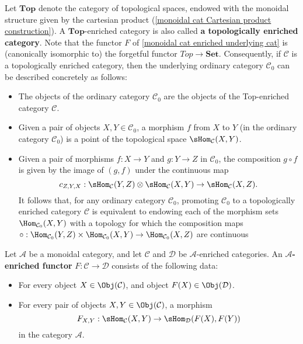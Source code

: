 \begin{example}\label{monoidal cat enriched over Top}
Let $\mathbf{Top}$ denote the category of topological spaces, endowed with the monoidal structure given by the cartesian product (\cref{monoidal cat Cartesian product construction}). A $\mathbf{Top}$-enriched category is also called \textbf{a topologically enriched category}. Note that the functor $F$ of \cref{monoidal cat enriched underlying cat} is (canonically isomorphic to) the forgetful functor $Top\to\mathbf{Set}$. Consequently, if $\mathcal{C}$ is a topologically enriched category, then the underlying ordinary category $\mathcal{C}_0$ can be described concretely as follows:
\begin{itemize}
\item The objects of the ordinary category $\mathcal{C}_0$ are the objects of the Top-enriched category $\mathcal{C}$.
\item Given a pair of objects $X,Y\in\mathcal{C}_0$, a morphism $f$ from $X$ to $Y$ (in the ordinary category $\mathcal{C}_0$) is a point of the topological space $\sHom_{\mathcal{C}}(X,Y)$.
\item Given a pair of morphisms $f:X\to Y$ and $g:Y\to Z$ in $\mathcal{C}_0$, the composition $g\circ f$ is given by the image of $(g,f)$ under the continuous map
\[c_{Z,Y,X}:\sHom_{\mathcal{C}}(Y,Z)\otimes\sHom_{\mathcal{C}}(X,Y)\to\sHom_{\mathcal{C}}(X,Z).\]
It follows that, for any ordinary category $\mathcal{C}_0$, promoting $\mathcal{C}_0$ to a topologically enriched category $\mathcal{C}$ is equivalent to endowing each of the morphism sets $\Hom_{\mathcal{C}_0}(X,Y)$ with a topology for which the composition maps $\circ:\Hom_{\mathcal{C}_0}(Y,Z)\times\Hom_{\mathcal{C}_0}(X,Y)\to\Hom_{\mathcal{C}_0}(X,Z)$ are continuous
\end{itemize}
\end{example}
Let $\mathcal{A}$ be a monoidal category, and let $\mathcal{C}$ and $\mathcal{D}$ be $\mathcal{A}$-enriched categories. An \textbf{$\mathcal{A}$-enriched functor} $F:\mathcal{C}\to\mathcal{D}$ consists of the following data:
\begin{itemize}
\item For every object $X\in\Obj(\mathcal{C})$, and object $F(X)\in\Obj(\mathcal{D})$.
\item For every pair of objects $X,Y\in\Obj(\mathcal{C})$, a morphism
\[F_{X,Y}:\sHom_{\mathcal{C}}(X,Y)\to\sHom_{\mathcal{D}}(F(X),F(Y))\]
in the category $\mathcal{A}$.
\end{itemize}
